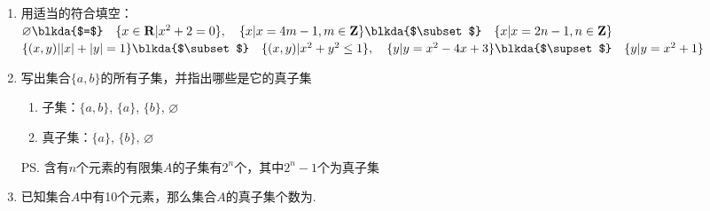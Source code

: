 \begin{enumerate}
\begin{jieda}
    \begin{enumerate}
        \item $A = \{1,2,3,4,6,12\}, 12 \in A, 12 \notin B, 4 \in A, 4 \notin B$，故 $B \subset A$
        \item 取$m = k + 1$，对应的元素相等，所以$C \subseteq D$，又有$-2 \in D, -2 \notin C$，故$C \subset D$
    \end{enumerate}
    \end{jieda} 
    \item 用适当的符合填空：\\
    $\varnothing \blkda{$=$} \quad \{x \in \mathbf{R} | x^2 + 2 = 0\}, \quad \{x | x = 4m -1, m \in \mathbf{Z}\} \blkda{$\subset$} \quad \{x | x = 2n -1, n \in \mathbf{Z}\}$ \\
    $\{(x,y) | |x| + |y| = 1\} \blkda{$\subset$} \quad \{(x,y) | x^2 + y^2 \leq 1\}, \quad \{y | y = x^2-4x+3 \} \blkda{$\supset$} \quad \{y | y = x^2+1\}
    $
    \item 写出集合$\{a,b\}$的所有子集，并指出哪些是它的真子集
    \begin{jieda}
        \begin{enumerate}
            \item 子集：$\{a, b\}$, $\{a\}$, $\{b\}$, $\varnothing$
            \item 真子集：$\{a\}$, $\{b\}$, $\varnothing$
        \end{enumerate}
        \ps 含有$n$个元素的有限集$A$的子集有$2^n$个，其中$2^n-1$个为真子集
    \end{jieda}
    \item 已知集合$A$中有10个元素，那么集合$A$的真子集个数为.


\end{enumerate}
